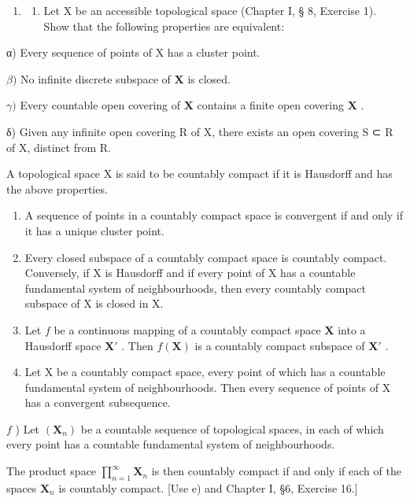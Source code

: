 \begin{enumerate}
\def\labelenumi{\arabic{enumi})}
\setcounter{enumi}{13}
\tightlist
\item
  \begin{enumerate}
  \def\labelenumii{\alph{enumii})}
  \tightlist
  \item
    Let X be an accessible topological space (Chapter I, § 8, Exercise 1). Show that the following properties are equivalent:
  \end{enumerate}
\end{enumerate}

α) Every sequence of points of X has a cluster point.

\(\beta)\) No infinite discrete subspace of \(\mathbf{X}\) is closed.

\(\gamma)\) Every countable open covering of \(\mathbf{X}\) contains a finite open covering \(\mathbf{X}\) .

δ) Given any infinite open covering R of X, there exists an open covering S ⊂ R of X, distinct from R.

A topological space X is said to be countably compact if it is Hausdorff and has the above properties.

\begin{enumerate}
\def\labelenumi{\alph{enumi})}
\setcounter{enumi}{1}
\item
  A sequence of points in a countably compact space is convergent if and only if it has a unique cluster point.
\item
  Every closed subspace of a countably compact space is countably compact. Conversely, if X is Hausdorff and if every point of X has a countable fundamental system of neighbourhoods, then every countably compact subspace of X is closed in X.
\item
  Let \(f\) be a continuous mapping of a countably compact space \(\mathbf{X}\) into a Hausdorff space \(\mathbf{X}'\) . Then \(f(\mathbf{X})\) is a countably compact subspace of \(\mathbf{X}'\) .
\item
  Let X be a countably compact space, every point of which has a countable fundamental system of neighbourhoods. Then every sequence of points of X has a convergent subsequence.
\end{enumerate}

\(f\) ) Let \((\mathbf{X}_n)\) be a countable sequence of topological spaces, in each of which every point has a countable fundamental system of neighbourhoods.

The product space \(\prod_{n=1}^{\infty} \mathbf{X}_n\) is then countably compact if and only if each of the spaces \(\mathbf{X}_n\) is countably compact. {[}Use e) and Chapter I, §6, Exercise 16.{]}

